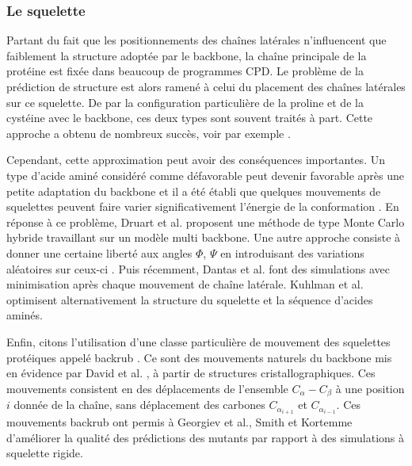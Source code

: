 \subsubsection{Le squelette}
Partant du fait que les positionnements des chaînes latérales n'influencent que faiblement la structure adoptée par le backbone, la chaîne principale de la protéine est fixée dans beaucoup de programmes CPD. Le problème de la prédiction de structure est alors ramené à celui du placement des chaînes latérales sur ce squelette. De par la configuration particulière de la proline et de la cystéine avec le backbone, ces deux types sont souvent traités à part. Cette approche a obtenu de nombreux succès, voir par exemple \cite{Dahiyat97b}.

Cependant, cette approximation peut avoir des conséquences importantes. Un type d'acide aminé considéré comme défavorable peut devenir favorable après une petite adaptation du backbone et il a été établi que quelques mouvements de squelettes peuvent faire varier significativement l'énergie de la conformation \cite{Desjarlais99}.
En réponse à ce problème, Druart et al. \cite{Druart16} proposent une méthode de type Monte Carlo hybride travaillant sur un modèle multi backbone. Une autre approche consiste à donner une certaine liberté aux angles $\Phi$, $\Psi$ en introduisant des variations aléatoires sur ceux-ci \cite{Desjarlais99}. Puis récemment, Dantas et al. \cite{Dantas07} font des simulations avec minimisation après chaque mouvement de chaîne latérale. Kuhlman et al. \cite{Kuhlman03}  optimisent alternativement la structure du squelette et la séquence d'acides aminés.

Enfin, citons l'utilisation d'une classe particulière de mouvement des squelettes protéiques appelé \og backrub \fg. Ce sont des mouvements naturels du backbone mis en évidence par David et al. \cite{Davis06}, à partir de structures cristallographiques. Ces mouvements consistent en des déplacements de l'ensemble $C_{\alpha}-C_{\beta}$ à une position $i$ donnée de la chaîne, sans déplacement des carbones $C_{\alpha_{i+1}}$ et $C_{\alpha_{i-1}}$. Ces mouvements backrub ont permis à Georgiev et al., Smith et Kortemme \cite{Georgiev08,Smith08} d'améliorer la qualité des prédictions des mutants par rapport à des simulations à squelette rigide.

